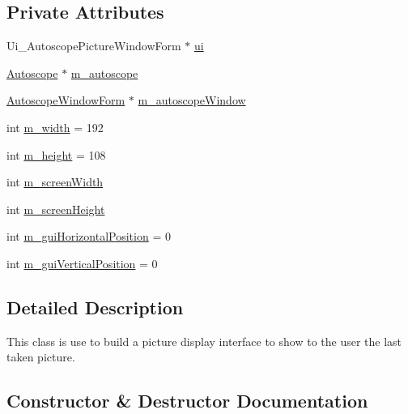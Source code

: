 \subsection*{Private Attributes}
\begin{DoxyCompactItemize}
\item 
Ui\+\_\+\+Autoscope\+Picture\+Window\+Form $\ast$ \hyperlink{class_autoscope_picture_window_form_aac9815d1313c1814ff9f0eefa4eeb47d}{ui}
\item 
\hyperlink{class_autoscope}{Autoscope} $\ast$ \hyperlink{class_autoscope_picture_window_form_ab6166280899d69142f4d7ed787c63f8f}{m\+\_\+autoscope}
\item 
\hyperlink{class_autoscope_window_form}{Autoscope\+Window\+Form} $\ast$ \hyperlink{class_autoscope_picture_window_form_ae20e4b58eec25e79ec4a0b5b7fa10e21}{m\+\_\+autoscope\+Window}
\item 
int \hyperlink{class_autoscope_picture_window_form_aa5dacd6f9d13d4cafa98edae38d161f5}{m\+\_\+width} = 192
\item 
int \hyperlink{class_autoscope_picture_window_form_aba2d2633eaffee2cff0babc6db1ab1e4}{m\+\_\+height} = 108
\item 
int \hyperlink{class_autoscope_picture_window_form_a0bf8e1210cdea9fcf58b0153d52b7f6c}{m\+\_\+screen\+Width}
\item 
int \hyperlink{class_autoscope_picture_window_form_a760dd289327d7731dd40dd9f3543588a}{m\+\_\+screen\+Height}
\item 
int \hyperlink{class_autoscope_picture_window_form_ab85a9e8a721d8b8f9d50c03d7dd91eaf}{m\+\_\+gui\+Horizontal\+Position} = 0
\item 
int \hyperlink{class_autoscope_picture_window_form_acc65dba5ea960c1c8e38267b913a67d3}{m\+\_\+gui\+Vertical\+Position} = 0
\end{DoxyCompactItemize}


\subsection{Detailed Description}
This class is use to build a picture display interface to show to the user the last taken picture. 

\subsection{Constructor \& Destructor Documentation}
